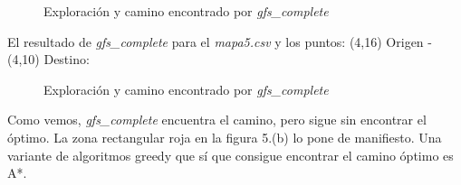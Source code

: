 \documentclass[conference]{IEEEtran}
\begin{document}
{\begin{figure}[H]
 \centering
 \caption{Exploración y camino encontrado por \textit{gfs\_complete}}
 \label{f:animales}
\end{figure}

El resultado de \textit{gfs\_complete} para el \textit{mapa5.csv} y los puntos: (4,16) Origen - (4,10) Destino:
\begin{figure}[H]
 \centering
 \caption{Exploración y camino encontrado por \textit{gfs\_complete}}
 \label{f:animales}
\end{figure}

Como vemos, \textit{gfs\_complete} encuentra el camino, pero sigue sin encontrar el óptimo. La zona rectangular roja en la figura 5.(b) lo pone de manifiesto. Una variante de algoritmos greedy que sí que consigue encontrar el camino óptimo es A*.

}
\end{document}
